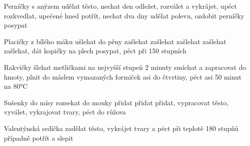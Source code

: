 \documentclass[12pt,a4paper]{article}
\begin{document}
\begin{recipe}{Perníčky s anýzem}
   udělat těsto, nechat den odležet, rozválet a vy\-krá\-jet, upéct
   rozkvedlat, upečené hned potřít, nechat dva dny
   udělat polevu, ozdobit perníčky
   posypat
\end{recipe}
\newpage

\begin{recipe}{Placičky z bílého máku}
   ušlehat do pěny
   zašlehat
   zašlehat
   zašlehat
   zašlehat
   zašlehat, dát kopičky na plech
   posypat, péct při 150 stupních
\end{recipe}
\newpage

\begin{recipe}{Rakvičky}
   šlehat metličkami na nejvyšší stupeň 2 minuty
   smíchat a zapracovat do hmoty, plnit do máslem vymazaných formiček asi do čtvrtiny, péct asi 50 minut na 80°C
\end{recipe}
\newpage

\begin{recipe}{Sušenky}
   do mísy
   rozsekat do mouky
   přidat
   přidat
   přidat, vypracovat těsto, vyválet, vykrajovat tva\-ry, péct do růžova
\end{recipe}
\newpage

\begin{recipe}{Valentýnská srdíčka}
   zadělat těsto, vykrájet tvary a péct při teplotě 180 stupňů
   případně potřít a slepit
\end{recipe}
\newpage
\end{document}

